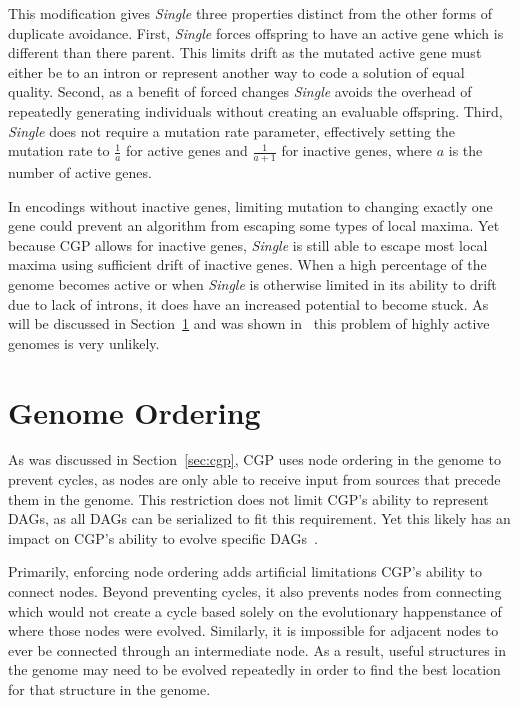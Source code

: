 \documentclass[journal]{IEEEtran}
\begin{document}
This modification gives \emph{Single} three properties distinct from the other
forms of duplicate avoidance.  First, \emph{Single} forces offspring to have
an active gene which is different than there parent.  This limits drift as the
mutated active gene must either be to an intron or represent another way to
code a solution of equal quality.  Second, as a benefit of forced changes
\emph{Single} avoids the overhead of repeatedly generating individuals without
creating an evaluable offspring.  Third, \emph{Single} does not require a mutation
rate parameter, effectively setting the mutation rate to $\frac{1}{a}$ for active
genes and $\frac{1}{a+1}$ for inactive genes, where $a$ is the number of active genes.

In encodings without inactive genes, limiting mutation to changing exactly one gene
could prevent an algorithm from escaping some types of local maxima.  Yet because
CGP allows for inactive genes, \emph{Single} is still able to escape most local
maxima using sufficient drift of inactive genes.  When a high percentage of
the genome becomes active or when \emph{Single} is otherwise limited in its ability
to drift due to lack of introns, it does have an increased potential to become stuck.
As will be discussed in Section~\ref{sec:ordering} and was shown in~\cite{goldman:2013:ordering}
this problem of highly active genomes is very unlikely.

\section{Genome Ordering}
\label{sec:ordering}
As was discussed in Section~\ref{sec:cgp}, CGP uses node ordering in the genome
to prevent cycles, as nodes are only able to receive input from sources that
precede them in the genome.  This restriction does not limit CGP's ability
to represent DAGs, as all DAGs can be serialized to fit this requirement.
Yet this likely has an impact on CGP's ability to evolve specific
DAGs~\cite{goldman:2013:ordering}.

Primarily, enforcing node ordering adds artificial limitations CGP's ability to
connect nodes.  Beyond preventing cycles, it also prevents nodes from connecting
which would not create a cycle based solely on the evolutionary happenstance of
where those nodes were evolved.  Similarly, it is impossible for adjacent nodes
to ever be connected through an intermediate node.  As a result, useful structures
in the genome may need to be evolved repeatedly in order to find the best
location for that structure in the genome.
\end{document}
